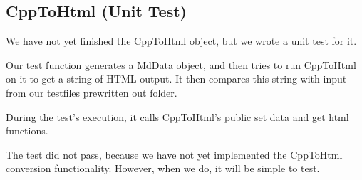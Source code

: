 \subsection{CppToHtml (Unit Test)}

We have not yet finished the CppToHtml object, but we wrote a unit test for it.

Our test function generates a MdData object, and then tries to run CppToHtml on it to get a string of HTML output. It then compares this string with input from our testfiles prewritten out  folder. 

During the test's execution, it calls CppToHtml's public set data and get html functions.

The test did not pass, because we have not yet implemented the CppToHtml conversion functionality. However, when we do, it will be simple to test.
